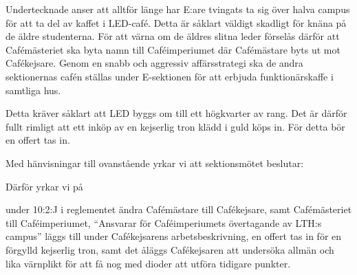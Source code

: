 \documentclass[../_main/handlingar.tex]{subfiles}
\begin{document}

Undertecknade anser att alltför länge har E:are tvingats ta sig över halva campus för att ta del av kaffet i LED-café. Detta är såklart väldigt skadligt för knäna på de äldre studenterna. För att värna om de äldres slitna leder förselås därför att Cafémästeriet ska byta namn till Caféimperiumet där Cafémästare byts ut mot Cafékejsare. Genom en snabb och aggressiv affärsstrategi ska de andra sektionernas cafén ställas under E-sektionen för att erbjuda funktionärskaffe i samtliga hus.

Detta kräver såklart att LED byggs om till ett högkvarter av rang. Det är därför fullt rimligt att ett inköp av en kejserlig tron klädd i guld köps in.  För detta bör en offert tas in.

Med hänvisningar till ovanstående yrkar vi att sektionsmötet beslutar:


Därför yrkar vi på
\begin{attsatser}
    \att under 10:2:J i reglementet ändra Cafémästare till Cafékejsare, samt Cafémästeriet till Caféimperiumet,
    \att “Ansvarar för Caféimperiumets övertagande av LTH:s campus” läggs till under Cafékejsarens arbetsbeskrivning,
    \att en offert tas in för en förgylld kejserlig tron, samt
    \att det åläggs Cafékejsaren att undersöka allmän och lika värnplikt för att få nog med dioder att utföra tidigare punkter.

    
\end{attsatser}

\begin{signatures}{1}
    \mvh
    \signature{Imperialister med kaffeposter}{}
\end{signatures}
\end{document}
